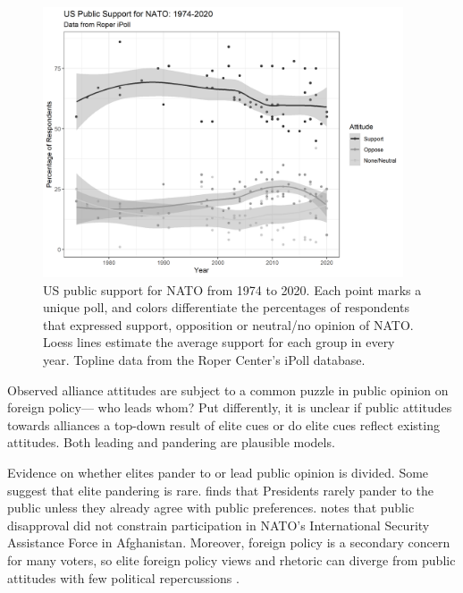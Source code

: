 \documentclass[12pt]{article}
\begin{document}
\begin{figure}
	\centering
		\includegraphics[width=0.95\textwidth]{../figures/nato-op-time.png}
	\caption{US public support for NATO from 1974 to 2020. Each point marks a unique poll, and colors differentiate the percentages of respondents that expressed support, opposition or neutral/no opinion of NATO. Loess lines estimate the average support for each group in every year. Topline data from the Roper Center's iPoll database.}
	\label{fig:nato-op-time}
\end{figure}



Observed alliance attitudes are subject to a common puzzle in public opinion on foreign policy--- who leads whom? 
Put differently, it is unclear if public attitudes towards alliances a top-down result of elite cues or do elite cues reflect existing attitudes. 
Both leading and pandering are plausible models. 


Evidence on whether elites pander to or lead public opinion is divided.
Some suggest that elite pandering is rare. 
\citet{Canes-Wrone2006} finds that Presidents rarely pander to the public unless they already agree with public preferences.
\citet{Kreps2010} notes that public disapproval did not constrain participation in NATO's International Security Assistance Force in Afghanistan. 
Moreover, foreign policy is a secondary concern for many voters, so elite foreign policy views and rhetoric can diverge from public attitudes with few political repercussions \citep{BusbyMonten2012}. 
\end{document}
